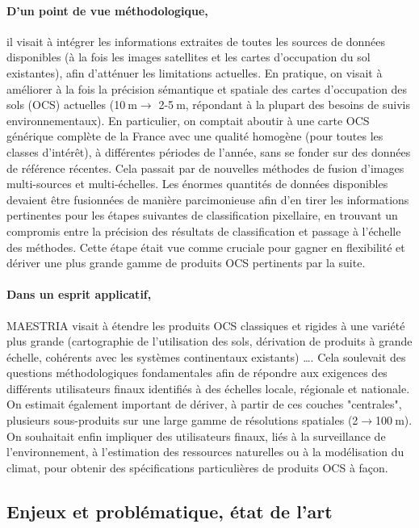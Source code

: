 \paragraph{D'un point de vue méthodologique,} il visait à intégrer les informations extraites de toutes les sources de données disponibles (à la fois les images satellites et les cartes d'occupation du sol existantes), afin d'atténuer les limitations actuelles. En pratique, on visait à améliorer à la fois la précision sémantique et spatiale des cartes d'occupation des sols (OCS) actuelles
(10$\:$m$\rightarrow$ 2-5$\:$m, répondant à la plupart des besoins de suivis environnementaux). En particulier, on comptait aboutir à  une carte OCS générique complète de la France avec une qualité homogène (pour toutes les classes d'intérêt), à différentes périodes de l'année, sans se fonder sur des données de référence récentes. Cela passait par de nouvelles méthodes de fusion d'images multi-sources et multi-échelles. Les énormes quantités de données disponibles devaient être fusionnées de manière parcimonieuse afin d'en tirer les informations pertinentes pour les étapes suivantes de classification pixellaire, en trouvant un compromis entre la précision des résultats de classification et passage à l'échelle des méthodes. Cette étape était vue comme cruciale pour gagner en flexibilité et dériver une plus grande gamme de produits OCS pertinents par la suite.

\paragraph{Dans un esprit applicatif,} MAESTRIA visait à étendre les produits OCS classiques et rigides à une variété plus grande (cartographie de l'utilisation des sols, dérivation de produits à grande échelle, cohérents avec les systèmes continentaux existants) \ldots. Cela soulevait des questions méthodologiques fondamentales afin de répondre aux exigences des différents utilisateurs finaux identifiés à des échelles locale, régionale et nationale. On estimait également important de dériver, à partir de ces couches "centrales", plusieurs sous-produits sur une large gamme de résolutions spatiales (2$\rightarrow$100$\:$m). On souhaitait enfin impliquer des utilisateurs finaux, liés à la surveillance de l'environnement, à l'estimation des ressources naturelles ou à la modélisation du climat, pour obtenir des spécifications particulières de produits OCS à façon.

\subsection{Enjeux et problématique, état de l’art}


